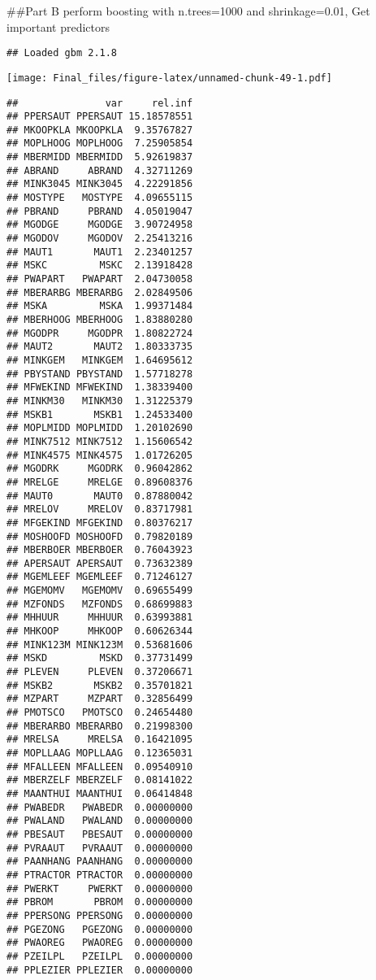 \documentclass[
]{article}
\begin{document}
\#\#Part B perform boosting with n.trees=1000 and shrinkage=0.01, Get
important predictors

\begin{verbatim}
## Loaded gbm 2.1.8
\end{verbatim}

\texttt{[image: Final\_files/figure-latex/unnamed-chunk-49-1.pdf]}

\begin{verbatim}
##               var     rel.inf
## PPERSAUT PPERSAUT 15.18578551
## MKOOPKLA MKOOPKLA  9.35767827
## MOPLHOOG MOPLHOOG  7.25905854
## MBERMIDD MBERMIDD  5.92619837
## ABRAND     ABRAND  4.32711269
## MINK3045 MINK3045  4.22291856
## MOSTYPE   MOSTYPE  4.09655115
## PBRAND     PBRAND  4.05019047
## MGODGE     MGODGE  3.90724958
## MGODOV     MGODOV  2.25413216
## MAUT1       MAUT1  2.23401257
## MSKC         MSKC  2.13918428
## PWAPART   PWAPART  2.04730058
## MBERARBG MBERARBG  2.02849506
## MSKA         MSKA  1.99371484
## MBERHOOG MBERHOOG  1.83880280
## MGODPR     MGODPR  1.80822724
## MAUT2       MAUT2  1.80333735
## MINKGEM   MINKGEM  1.64695612
## PBYSTAND PBYSTAND  1.57718278
## MFWEKIND MFWEKIND  1.38339400
## MINKM30   MINKM30  1.31225379
## MSKB1       MSKB1  1.24533400
## MOPLMIDD MOPLMIDD  1.20102690
## MINK7512 MINK7512  1.15606542
## MINK4575 MINK4575  1.01726205
## MGODRK     MGODRK  0.96042862
## MRELGE     MRELGE  0.89608376
## MAUT0       MAUT0  0.87880042
## MRELOV     MRELOV  0.83717981
## MFGEKIND MFGEKIND  0.80376217
## MOSHOOFD MOSHOOFD  0.79820189
## MBERBOER MBERBOER  0.76043923
## APERSAUT APERSAUT  0.73632389
## MGEMLEEF MGEMLEEF  0.71246127
## MGEMOMV   MGEMOMV  0.69655499
## MZFONDS   MZFONDS  0.68699883
## MHHUUR     MHHUUR  0.63993881
## MHKOOP     MHKOOP  0.60626344
## MINK123M MINK123M  0.53681606
## MSKD         MSKD  0.37731499
## PLEVEN     PLEVEN  0.37206671
## MSKB2       MSKB2  0.35701821
## MZPART     MZPART  0.32856499
## PMOTSCO   PMOTSCO  0.24654480
## MBERARBO MBERARBO  0.21998300
## MRELSA     MRELSA  0.16421095
## MOPLLAAG MOPLLAAG  0.12365031
## MFALLEEN MFALLEEN  0.09540910
## MBERZELF MBERZELF  0.08141022
## MAANTHUI MAANTHUI  0.06414848
## PWABEDR   PWABEDR  0.00000000
## PWALAND   PWALAND  0.00000000
## PBESAUT   PBESAUT  0.00000000
## PVRAAUT   PVRAAUT  0.00000000
## PAANHANG PAANHANG  0.00000000
## PTRACTOR PTRACTOR  0.00000000
## PWERKT     PWERKT  0.00000000
## PBROM       PBROM  0.00000000
## PPERSONG PPERSONG  0.00000000
## PGEZONG   PGEZONG  0.00000000
## PWAOREG   PWAOREG  0.00000000
## PZEILPL   PZEILPL  0.00000000
## PPLEZIER PPLEZIER  0.00000000

\end{verbatim}
\end{document}

